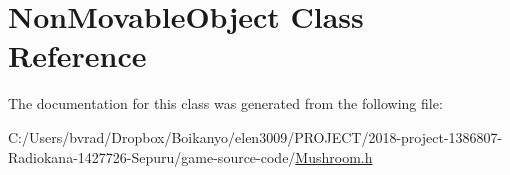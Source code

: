 \hypertarget{class_non_movable_object}{}\section{Non\+Movable\+Object Class Reference}
\label{class_non_movable_object}


The documentation for this class was generated from the following file\+:\begin{DoxyCompactItemize}
\item 
C\+:/\+Users/bvrad/\+Dropbox/\+Boikanyo/elen3009/\+P\+R\+O\+J\+E\+C\+T/2018-\/project-\/1386807-\/\+Radiokana-\/1427726-\/\+Sepuru/game-\/source-\/code/\mbox{\hyperlink{_mushroom_8h}{Mushroom.\+h}}\end{DoxyCompactItemize}
